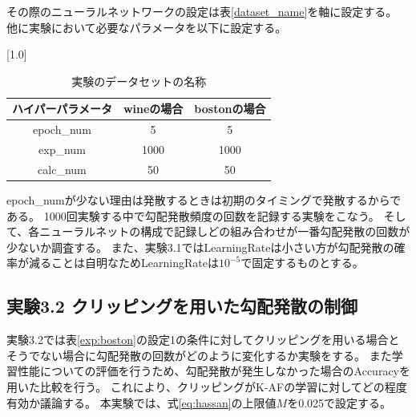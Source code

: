 その際のニューラルネットワークの設定は表\ref{dataset_name}を軸に設定する。
他に実験において必要なパラメータを以下に設定する。


\begin{table}[hbtp]
    \begin{center}
        \caption{実験のデータセットの名称}
        \vspace{2mm} 
        \scalebox{1.0}[1.0]{
            \begin{tabular}{||c|c|c||}
            \hline
            ハイパーパラメータ  & wineの場合 & bostonの場合 \\
            \hline
            epoch\_num                            & 5       & 5  \\
            \hline
            exp\_num                           & 1000     & 1000 \\
            \hline
            calc\_num        & 50           & 50  \\
            \hline
            \end{tabular}
        }
    \end{center}
\end{table}

epoch\_numが少ない理由は発散するときは初期のタイミングで発散するからである。
1000回実験する中で勾配発散頻度の回数を記録する実験をこなう。
そして、各ニューラルネットの構成で記録しどの組み合わせが一番勾配発散の回数が少ないか調査する。
また、実験3.1ではLearningRateは小さい方が勾配発散の確率が減ることは自明なためLearningRateは$ 10^{-5} $で固定するものとする。




\subsection{実験3.2 クリッピングを用いた勾配発散の制御}
\label{exp3.2}
実験3.2では表\ref{exp:boston}の設定1の条件に対してクリッピングを用いる場合とそうでない場合に勾配発散の回数がどのように変化するか実験をする。
また学習性能についての評価を行うため、勾配発散が発生しなかった場合のAccuracyを用いた比較を行う。
これにより、クリッピングがK-AFの学習に対してどの程度有効か議論する。
本実験では、式\ref{eq:hassan}の上限値$ M $を0.025で設定する。



